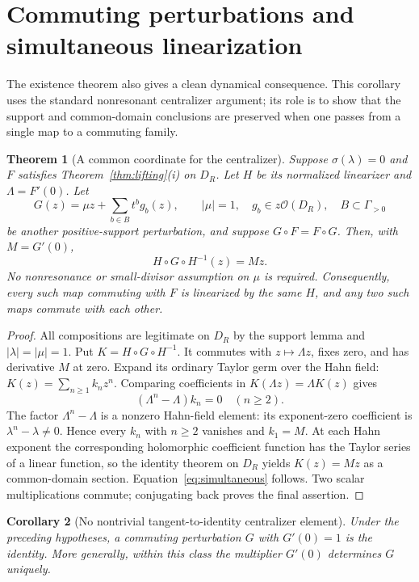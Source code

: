 \documentclass[11pt,a4paper]{article}
\numberwithin{equation}{section}
\newtheorem{theorem}{Theorem}[section]
\newtheorem{corollary}[theorem]{Corollary}
\theoremstyle{definition}
\theoremstyle{remark}
\begin{document}
\section{Commuting perturbations and simultaneous linearization}\label{sec:centralizer}

The existence theorem also gives a clean dynamical consequence. This
corollary uses the standard nonresonant centralizer argument; its role is
to show that the support and common-domain conclusions are preserved when
one passes from a single map to a commuting family.

\begin{theorem}[A common coordinate for the centralizer]\label{thm:centralizer}
Suppose $\sigma(\lambda)=0$ and $F$ satisfies
Theorem~\ref{thm:lifting}(i) on $D_R$. Let $H$ be its normalized
linearizer and $\Lambda=F'(0)$. Let
\[
 G(z)=\mu z+\sum_{b\in B}t^b g_b(z),\qquad
 |\mu|=1,\quad g_b\in z\mathcal O(D_R),\quad B\subset\Gamma_{>0}
\]
be another positive-support perturbation, and suppose $G\circ F=F\circ G$.
Then, with $M=G'(0)$,
\begin{equation}\label{eq:simultaneous}
 H\circ G\circ H^{-1}(z)=Mz.
\end{equation}
No nonresonance or small-divisor assumption on $\mu$ is required.
Consequently, every such map commuting with $F$ is linearized by the same
$H$, and any two such maps commute with each other.
\end{theorem}

\begin{proof}
All compositions are legitimate on $D_R$ by the support lemma and
$|\lambda|=|\mu|=1$. Put $K=H\circ G\circ H^{-1}$. It commutes with
$z\mapsto\Lambda z$, fixes zero, and has derivative $M$ at zero.
Expand its ordinary Taylor germ over the Hahn field:
$K(z)=\sum_{n\ge1}k_nz^n$. Comparing coefficients in
$K(\Lambda z)=\Lambda K(z)$ gives
\[
 (\Lambda^n-\Lambda)k_n=0\quad(n\ge2).
\]
The factor $\Lambda^n-\Lambda$ is a nonzero Hahn-field element: its
exponent-zero coefficient is $\lambda^n-\lambda\ne0$. Hence every
$k_n$ with $n\ge2$ vanishes and $k_1=M$. At each Hahn exponent the
corresponding holomorphic coefficient function has the Taylor series of
a linear function, so the identity theorem on $D_R$ yields $K(z)=Mz$
as a common-domain section. Equation~\eqref{eq:simultaneous} follows.
Two scalar multiplications commute; conjugating back proves the final
assertion.
\end{proof}

\begin{corollary}[No nontrivial tangent-to-identity centralizer element]
Under the preceding hypotheses, a commuting perturbation $G$ with
$G'(0)=1$ is the identity. More generally, within this class the multiplier
$G'(0)$ determines $G$ uniquely.
\end{corollary}
\end{document}
